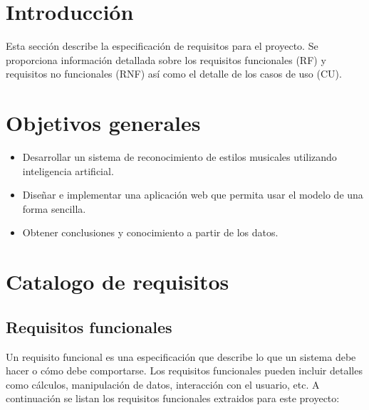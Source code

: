 
\section{Introducción}

Esta sección describe la especificación de requisitos para el proyecto. Se proporciona información detallada sobre los requisitos funcionales (RF) y requisitos no funcionales (RNF) así como el detalle de los casos de uso (CU).

\section{Objetivos generales}

\begin{itemize}
\tightlist
\item Desarrollar un sistema de reconocimiento de estilos musicales utilizando inteligencia artificial.
\item Diseñar e implementar una aplicación web que permita usar el modelo de una forma sencilla.
\item Obtener conclusiones y conocimiento a partir de los datos.
\end{itemize}

\section{Catalogo de requisitos}

\subsection{Requisitos funcionales}

Un requisito funcional es una especificación que describe lo que un sistema debe hacer o cómo debe comportarse.
Los requisitos funcionales pueden incluir detalles como cálculos, manipulación de datos, interacción con el usuario, etc.
A continuación se listan los requisitos funcionales extraidos para este proyecto:

